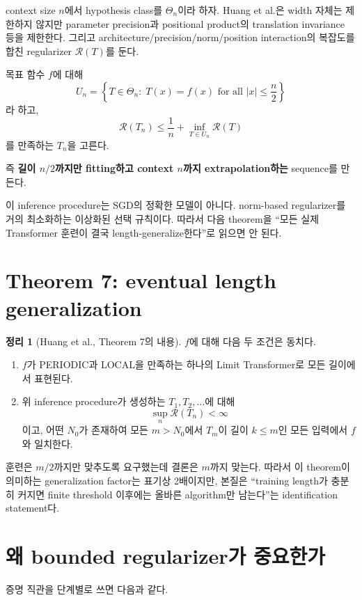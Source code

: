\documentclass[11pt,a4paper,oneside,openany]{memoir}
\newcommand{\Risk}{\mathcal{R}}
\theoremstyle{definition}
\newtheorem{theorem}{정리}[chapter]
\begin{document}
context size $n$에서 hypothesis class를 $\Theta_n$이라 하자.
Huang et al.은 width 자체는 제한하지 않지만 parameter precision과 positional product의 translation invariance 등을 제한한다.
그리고 architecture/precision/norm/position interaction의 복잡도를 합친 regularizer $\Risk(T)$를 둔다.

목표 함수 $f$에 대해
\[
U_n
=\left\{T\in\Theta_n:\;T(x)=f(x)\text{ for all }|x|\le \frac n2\right\}
\]
라 하고,
\[
\Risk(T_n)
\le
\frac1n+\inf_{T\in U_n}\Risk(T)
\]
를 만족하는 $T_n$을 고른다.

즉 \textbf{길이 $n/2$까지만 fitting하고 context $n$까지 extrapolation하는} sequence를 만든다.

\begin{warningbox}
이 inference procedure는 SGD의 정확한 모델이 아니다. norm-based regularizer를 거의 최소화하는 이상화된 선택 규칙이다.
따라서 다음 theorem을 ``모든 실제 Transformer 훈련이 결국 length-generalize한다''로 읽으면 안 된다.
\end{warningbox}

\section{Theorem 7: eventual length generalization}

\begin{theorem}[Huang et al., Theorem 7의 내용]
$f$에 대해 다음 두 조건은 동치다.
\begin{enumerate}
\item $f$가 PERIODIC과 LOCAL을 만족하는 하나의 Limit Transformer로 모든 길이에서 표현된다.
\item 위 inference procedure가 생성하는 $T_1,T_2,\ldots$에 대해
\[
\sup_n\Risk(T_n)<\infty
\]
이고, 어떤 $N_0$가 존재하여 모든 $m>N_0$에서 $T_m$이 길이 $k\le m$인 모든 입력에서 $f$와 일치한다.
\end{enumerate}
\end{theorem}

훈련은 $m/2$까지만 맞추도록 요구했는데 결론은 $m$까지 맞는다.
따라서 이 theorem이 의미하는 generalization factor는 표기상 2배이지만,
본질은 ``training length가 충분히 커지면 finite threshold 이후에는 올바른 algorithm만 남는다''는 identification statement다.

\section{왜 bounded regularizer가 중요한가}

증명 직관을 단계별로 쓰면 다음과 같다.
\end{document}
